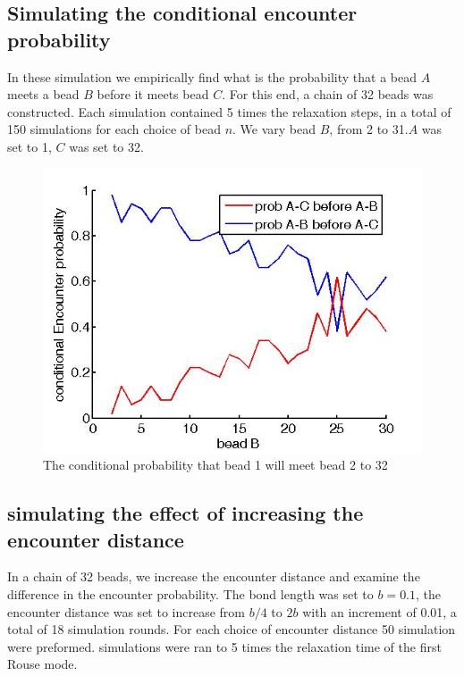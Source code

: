 \documentclass[12pt]{paper}
\begin{document}
\subsection{Simulating the conditional encounter probability}
In these simulation we empirically find what is the probability that a bead $A$ meets a bead $B$ before it meets bead $C$. For this end, a chain of 32 beads was constructed. Each simulation contained 5 times the relaxation steps, in a total of 150 simulations for each choice of bead $n$. We vary bead $B$, from 2 to 31.$A$ was set to 1, $C$ was set to 32.

\begin{figure}[H]
\includegraphics[scale=0.3]{conditionalEncounterProb32BeadsVaryBead2From2To31}
\caption{\scriptsize{The conditional probability that bead 1 will meet bead 2 to 32}}
\label{conditionalEncounterProb32BeadsVaryBead2From2To31}
\end{figure}

\subsection{simulating the effect of increasing the encounter distance}
In a chain of 32 beads, we increase the encounter distance and examine the difference in the encounter probability. 
The bond length was set to $b=0.1$, the encounter distance was set to increase from $b/4$ to $2b$ with an increment of 0.01, a total of 18 simulation rounds. For each choice of encounter distance 50 simulation were preformed. simulations were ran to 5 times the relaxation time of the first Rouse mode. 
\end{document}
